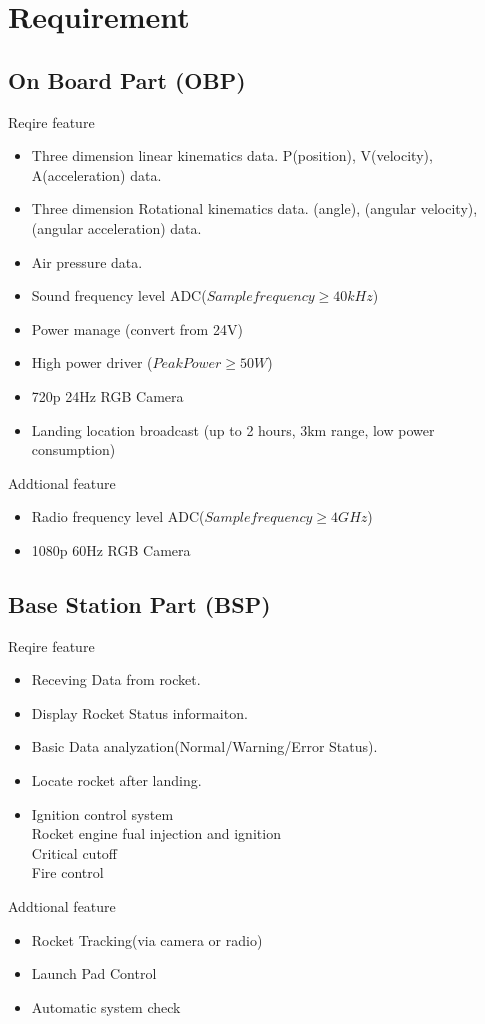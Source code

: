 \documentclass[12pt,article]{memoir}
\begin{document}
\section{Requirement}
\subsection{On Board Part (OBP)}
Reqire feature
\begin{itemize}
\item Three dimension linear kinematics data. P(position), V(velocity), A(acceleration) data.
\item Three dimension Rotational kinematics data. \theta(angle), \omega(angular velocity), \alpha(angular acceleration) data.
\item Air pressure data.
\item Sound frequency level ADC($Sample frequency \geq 40kHz$)
\item Power manage (convert from 24V)
\item High power driver ($Peak Power \geq 50W$)
\item 720p 24Hz RGB Camera 
\item Landing location broadcast (up to 2 hours, 3km range, low power consumption)
\end{itemize}
Addtional feature
\begin{itemize}
\item Radio frequency level ADC($Sample frequency \geq 4GHz$)
\item 1080p 60Hz RGB Camera 
\end{itemize}
\subsection{Base Station Part (BSP)}
Reqire feature
\begin{itemize}
\item Receving Data from rocket.
\item Display Rocket Status informaiton.
\item Basic Data analyzation(Normal/Warning/Error Status).
\item Locate rocket after landing.
\item Ignition control system\\
Rocket engine fual injection and ignition\\
Critical cutoff\\
Fire control\\
\end{itemize}
Addtional feature
\begin{itemize}
\item Rocket Tracking(via camera or radio)
\item Launch Pad Control
\item Automatic system check
\end{itemize}
\end{document}
